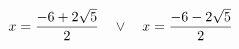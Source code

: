 \documentclass[preview]{standalone}
\begin{document}
\begin{align*}
\special{dvisvgm:raw <g id='unique000'>}x=\frac{-6 + 2 \sqrt{5}}{2} \quad \lor \quad x=\frac{-6 - 2 \sqrt{5}}{2}\special{dvisvgm:raw </g>}
\end{align*}
\end{document}

